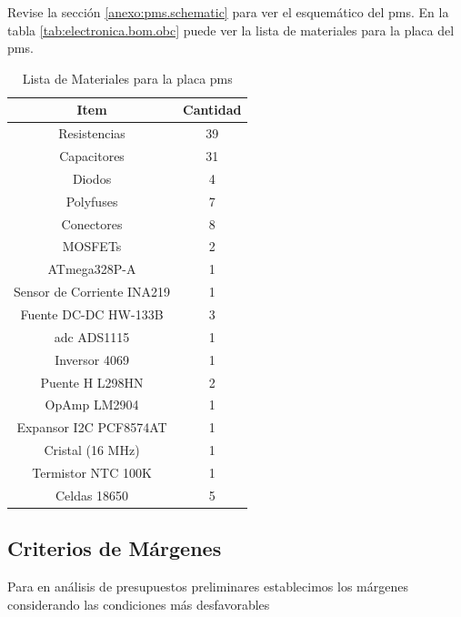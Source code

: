       Revise la sección \ref{anexo:pms.schematic} para ver el esquemático del \acrfull{pms}. En la tabla
      \ref{tab:electronica.bom.obc} puede ver la lista de materiales para la placa del \acrshort{pms}.

      \begin{table}[H]
        \centering
        \begin{tabular}{|c|c|}
          \hline
          \textbf{Item}               & \textbf{Cantidad} \\ \hline
          Resistencias                & 39 \\ \hline
          Capacitores                 & 31 \\ \hline
          Diodos                      & 4 \\ \hline
          Polyfuses                   & 7 \\ \hline
          Conectores                  & 8 \\ \hline
          MOSFETs                     & 2 \\ \hline
          ATmega328P-A                & 1 \\ \hline
          Sensor de Corriente INA219  & 1 \\ \hline
          Fuente DC-DC HW-133B        & 3 \\ \hline
          \acrshort{adc} ADS1115      & 1 \\ \hline
          Inversor 4069               & 1 \\ \hline
          Puente H L298HN             & 2 \\ \hline
          OpAmp LM2904                & 1 \\ \hline
          Expansor I2C PCF8574AT      & 1 \\ \hline
          Cristal (16 MHz)            & 1 \\ \hline
          Termistor NTC 100K          & 1 \\ \hline
          Celdas 18650                & 5 \\ \hline
        \end{tabular}
        \caption{Lista de Materiales para la placa \acrshort{pms}}
        \label{tab:electronica.bom.pms}
      \end{table}

  \subsection{Criterios de Márgenes}
    Para en análisis de presupuestos preliminares establecimos los márgenes considerando las condiciones más
    desfavorables

